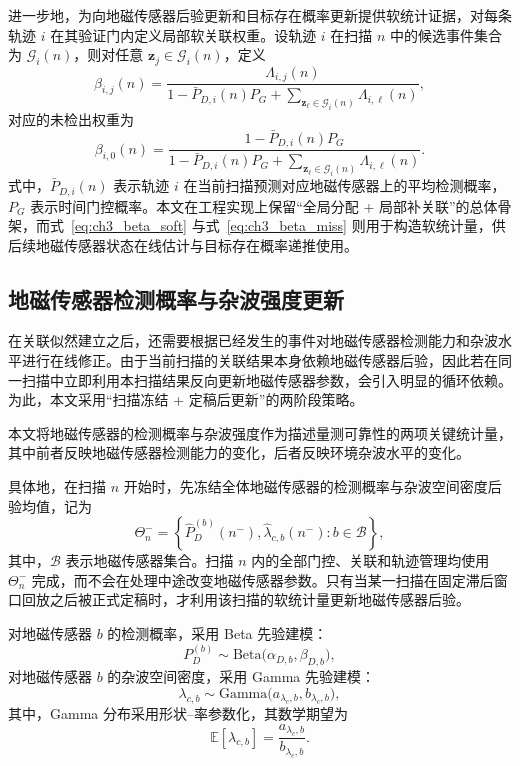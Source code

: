 \documentclass{xdupgthesis}
\begin{document}
进一步地，为向地磁传感器后验更新和目标存在概率更新提供软统计证据，对每条轨迹 $i$ 在其验证门内定义局部软关联权重。设轨迹 $i$ 在扫描 $n$ 中的候选事件集合为 $\mathcal G_i(n)$，则对任意 $\mathbf z_j\in\mathcal G_i(n)$，定义
\begin{equation}
	\beta_{i,j}(n)=
	\frac{\Lambda_{i,j}(n)}{1-\bar P_{D,i}(n)P_G+\sum\limits_{\mathbf z_\ell\in\mathcal G_i(n)}\Lambda_{i,\ell}(n)},
	\label{eq:ch3_beta_soft}
\end{equation}
对应的未检出权重为
\begin{equation}
	\beta_{i,0}(n)=
	\frac{1-\bar P_{D,i}(n)P_G}{1-\bar P_{D,i}(n)P_G+\sum\limits_{\mathbf z_\ell\in\mathcal G_i(n)}\Lambda_{i,\ell}(n)}.
	\label{eq:ch3_beta_miss}
\end{equation}
式中，$\bar P_{D,i}(n)$ 表示轨迹 $i$ 在当前扫描预测对应地磁传感器上的平均检测概率，$P_G$ 表示时间门控概率。本文在工程实现上保留“全局分配 + 局部补关联”的总体骨架，而式~\eqref{eq:ch3_beta_soft} 与式~\eqref{eq:ch3_beta_miss} 则用于构造软统计量，供后续地磁传感器状态在线估计与目标存在概率递推使用。

\subsection{地磁传感器检测概率与杂波强度更新}
\label{subsec:ch3_node_stats}

在关联似然建立之后，还需要根据已经发生的事件对地磁传感器检测能力和杂波水平进行在线修正。由于当前扫描的关联结果本身依赖地磁传感器后验，因此若在同一扫描中立即利用本扫描结果反向更新地磁传感器参数，会引入明显的循环依赖。为此，本文采用“扫描冻结 + 定稿后更新”的两阶段策略。

本文将地磁传感器的检测概率与杂波强度作为描述量测可靠性的两项关键统计量，其中前者反映地磁传感器检测能力的变化，后者反映环境杂波水平的变化。

具体地，在扫描 $n$ 开始时，先冻结全体地磁传感器的检测概率与杂波空间密度后验均值，记为
\begin{equation}
	\Theta_n^{-}=
	\left\{
	\hat P_D^{(b)}(n^-),\hat\lambda_{c,b}(n^-):b\in\mathcal B
	\right\},
	\label{eq:ch3_theta_frozen}
\end{equation}
其中，$\mathcal B$ 表示地磁传感器集合。扫描 $n$ 内的全部门控、关联和轨迹管理均使用 $\Theta_n^{-}$ 完成，而不会在处理中途改变地磁传感器参数。只有当某一扫描在固定滞后窗口回放之后被正式定稿时，才利用该扫描的软统计量更新地磁传感器后验。

对地磁传感器 $b$ 的检测概率，采用 Beta 先验建模：
\begin{equation}
	P_D^{(b)}\sim \mathrm{Beta}\bigl(\alpha_{D,b},\beta_{D,b}\bigr),
	\label{eq:ch3_beta_prior}
\end{equation}
对地磁传感器 $b$ 的杂波空间密度，采用 Gamma 先验建模：
\begin{equation}
	\lambda_{c,b}\sim \mathrm{Gamma}\bigl(a_{\lambda_c,b},b_{\lambda_c,b}\bigr),
	\label{eq:ch3_gamma_prior}
\end{equation}
其中，Gamma 分布采用形状--率参数化，其数学期望为
\begin{equation}
	\mathbb E[\lambda_{c,b}]=\frac{a_{\lambda_c,b}}{b_{\lambda_c,b}}.
	\label{eq:ch3_kappa_mean}
\end{equation}
\end{document}
